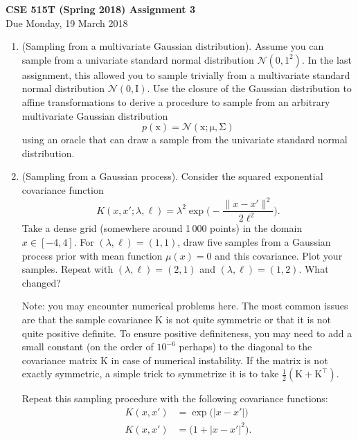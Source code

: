 \documentclass{article}
\newcommand{\mc}[1]{\mathcal{#1}}
\newcommand{\mat}[1]{\bm{\mathrm{#1}}}
\renewcommand{\vec}[1]{\bm{\mathrm{#1}}}
\newcommand{\trans}{^\top}
\begin{document}
{\large \textbf{CSE 515T (Spring 2018) Assignment 3}} \\
Due Monday, 19 March 2018 \\

\begin{enumerate}

\item
  (Sampling from a multivariate Gaussian distribution).  Assume you can sample
  from a univariate standard normal distribution $\mc{N}(0, 1^2)$.  In the last
  assignment, this allowed you to sample trivially from a multivariate standard
  normal distribution $\mc{N}(\vec{0}, \mat{I})$.  Use the closure of the
  Gaussian distribution to affine transformations to derive a procedure to
  sample from an arbitrary multivariate Gaussian distribution
  \[
    p(\vec{x}) = \mc{N}(\vec{x}; \vec{\mu}, \mat{\Sigma})
  \]
  using an oracle that can draw a sample from the univariate standard normal
  distribution.

\item
  (Sampling from a Gaussian process).
  Consider the squared exponential covariance function
  \begin{equation}
    \label{sqdexp}
    K(x, x'; \lambda, \ell)
    =
    \lambda^2
    \exp\biggl(
    -\frac{\lVert x - x' \rVert^2}{2\ell^2}
    \biggr).
  \end{equation}
  Take a dense grid (somewhere around 1\,000 points) in the domain $x \in [-4,
    4]$.  For $(\lambda, \ell) = (1, 1)$, draw five samples from a Gaussian
  process prior with mean function $\mu(x) = 0$ and this covariance.  Plot your
  samples.  Repeat with $(\lambda, \ell) = (2, 1)$ and $(\lambda, \ell) = (1,
  2)$.  What changed?

  Note: you may encounter numerical problems here.  The most common issues are
  that the sample covariance $\mat{K}$ is not quite symmetric or that it is not
  quite positive definite.  To ensure positive definiteness, you may need to add
  a small constant (on the order of $10^{-6}$ perhaps) to the diagonal to the
  covariance matrix $\mat{K}$ in case of numerical instability.  If the matrix
  is not exactly symmetric, a simple trick to symmetrize it is to take
  $\frac{1}{2}(\mat{K} + \mat{K}\trans)$.

  Repeat this sampling procedure with the following covariance functions:
  \begin{align*}
    K(x, x')
    &=
    \exp\bigl(\lvert x - x' \rvert\bigr)
    \\
    K(x, x')
    &=
    \bigl(1 + \lvert x - x' \rvert^2\bigr).
  \end{align*}


\end{enumerate}
\end{document}
